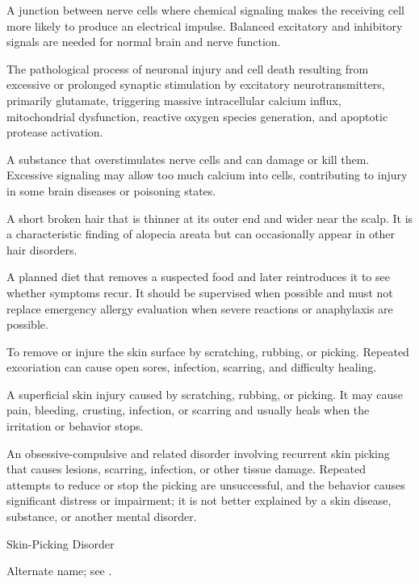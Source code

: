  A junction between nerve cells where chemical signaling makes the receiving cell more likely to produce an electrical impulse. Balanced excitatory and inhibitory signals are needed for normal brain and nerve function.

 The pathological process of neuronal injury and cell death resulting from excessive or prolonged synaptic stimulation by excitatory neurotransmitters, primarily glutamate, triggering massive intracellular calcium influx, mitochondrial dysfunction, reactive oxygen species generation, and apoptotic protease activation.

 A substance that overstimulates nerve cells and can damage or kill them. Excessive signaling may allow too much calcium into cells, contributing to injury in some brain diseases or poisoning states.

 A short broken hair that is thinner at its outer end and wider near the scalp. It is a characteristic finding of alopecia areata but can occasionally appear in other hair disorders.

 A planned diet that removes a suspected food and later reintroduces it to see whether symptoms recur. It should be supervised when possible and must not replace emergency allergy evaluation when severe reactions or anaphylaxis are possible.

 To remove or injure the skin surface by scratching, rubbing, or picking. Repeated excoriation can cause open sores, infection, scarring, and difficulty healing.

 A superficial skin injury caused by scratching, rubbing, or picking. It may cause pain, bleeding, crusting, infection, or scarring and usually heals when the irritation or behavior stops.

 An obsessive-compulsive and related disorder involving recurrent skin picking that causes lesions, scarring, infection, or other tissue damage. Repeated attempts to reduce or stop the picking are unsuccessful, and the behavior causes significant distress or impairment; it is not better explained by a skin disease, substance, or another mental disorder.

\synonyms
Skin-Picking Disorder

 Alternate name; see .


